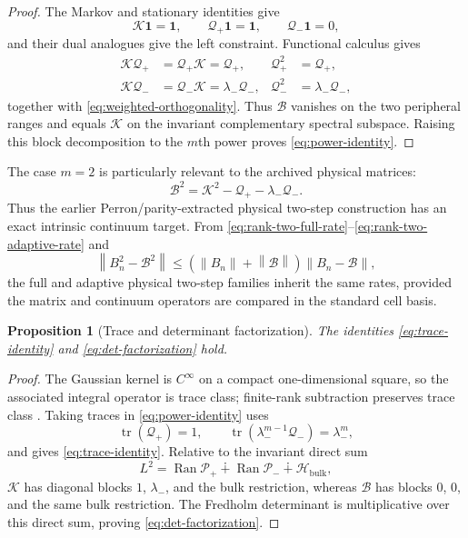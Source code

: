 \documentclass[11pt]{article}
\newtheorem{proposition}[theorem]{Proposition}
\theoremstyle{definition}
\theoremstyle{remark}
\newcommand{\cK}{\mathcal K}
\newcommand{\cB}{\mathcal B}
\newcommand{\cP}{\mathcal P}
\newcommand{\cQ}{\mathcal Q}
\newcommand{\norm}[1]{\left\lVert #1\right\rVert}
\newcommand{\Ran}{\operatorname{Ran}}
\newcommand{\tr}{\operatorname{tr}}
\begin{document}
\begin{proof}
The Markov and stationary identities give
\[
 \cK\mathbf1=\mathbf1,
 \qquad
 \cQ_+\mathbf1=\mathbf1,
 \qquad
 \cQ_-\mathbf1=0,
\]
and their dual analogues give the left constraint.  Functional calculus
gives
\begin{align*}
 \cK\cQ_+&=\cQ_+\cK=\cQ_+, & \cQ_+^2&=\cQ_+,\\
 \cK\cQ_-&=\cQ_-\cK=\lambda_-\cQ_-,
 & \cQ_-^2&=\lambda_-\cQ_-,
\end{align*}
together with \eqref{eq:weighted-orthogonality}.  Thus $\cB$ vanishes on
the two peripheral ranges and equals $\cK$ on the invariant complementary
spectral subspace.  Raising this block decomposition to the $m$th power
proves \eqref{eq:power-identity}.
\end{proof}

The case $m=2$ is particularly relevant to the archived physical matrices:
\begin{equation}
 \cB^2=\cK^2-\cQ_+-\lambda_-\cQ_-.
 \label{eq:physical-two-step}
\end{equation}
Thus the earlier Perron/parity-extracted physical two-step construction has
an exact intrinsic continuum target.  From
\eqref{eq:rank-two-full-rate}--\eqref{eq:rank-two-adaptive-rate} and
\[
 \norm{B_n^2-\cB^2}
 \le(\norm{B_n}+\norm{\cB})\norm{B_n-\cB},
\]
the full and adaptive physical two-step families inherit the same rates,
provided the matrix and continuum operators are compared in the standard
cell basis.

\begin{proposition}[Trace and determinant factorization]
\label{prop:trace-determinant}
The identities \eqref{eq:trace-identity} and
\eqref{eq:det-factorization} hold.
\end{proposition}

\begin{proof}
The Gaussian kernel is $C^\infty$ on a compact one-dimensional square, so
the associated integral operator is trace class; finite-rank subtraction
preserves trace class \citep{Simon2005,GohbergKrein1969}.  Taking traces in
\eqref{eq:power-identity} uses
\[
 \tr(\cQ_+)=1,
 \qquad
 \tr(\lambda_-^{m-1}\cQ_-)=\lambda_-^m,
\]
and gives \eqref{eq:trace-identity}.  Relative to the invariant direct sum
\[
 L^2=\Ran\cP_+\dotplus\Ran\cP_-\dotplus\mathcal H_{\mathrm{bulk}},
\]
$\cK$ has diagonal blocks $1$, $\lambda_-$, and the bulk restriction,
whereas $\cB$ has blocks $0$, $0$, and the same bulk restriction.  The
Fredholm determinant is multiplicative over this direct sum, proving
\eqref{eq:det-factorization}.
\end{proof}
\end{document}
